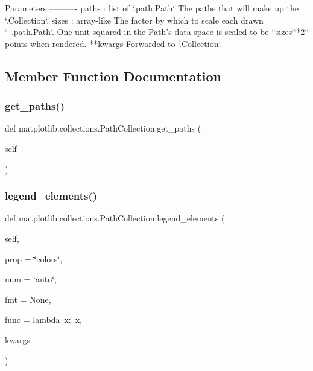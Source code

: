 \begin{DoxyVerb}Parameters
----------
paths : list of `.path.Path`
    The paths that will make up the `.Collection`.
sizes : array-like
    The factor by which to scale each drawn `~.path.Path`. One unit
    squared in the Path's data space is scaled to be ``sizes**2``
    points when rendered.
**kwargs
    Forwarded to `.Collection`.
\end{DoxyVerb}
 

\subsection{Member Function Documentation}
\mbox{\label{classmatplotlib_1_1collections_1_1PathCollection_a3df317b92612cb11c9927861338bf45a}} 
\subsubsection{\texorpdfstring{get\+\_\+paths()}{get\_paths()}}
{\footnotesize\ttfamily def matplotlib.\+collections.\+Path\+Collection.\+get\+\_\+paths (\begin{DoxyParamCaption}\item[{}]{self }\end{DoxyParamCaption})}

\mbox{\label{classmatplotlib_1_1collections_1_1PathCollection_a2be255d5b379e46ef788a227bc4d4221}} 
\subsubsection{\texorpdfstring{legend\+\_\+elements()}{legend\_elements()}}
{\footnotesize\ttfamily def matplotlib.\+collections.\+Path\+Collection.\+legend\+\_\+elements (\begin{DoxyParamCaption}\item[{}]{self,  }\item[{}]{prop = {\ttfamily \char`\"{}colors\char`\"{}},  }\item[{}]{num = {\ttfamily \char`\"{}auto\char`\"{}},  }\item[{}]{fmt = {\ttfamily None},  }\item[{}]{func = {\ttfamily lambda~x\+:~x},  }\item[{}]{kwargs }\end{DoxyParamCaption})}

